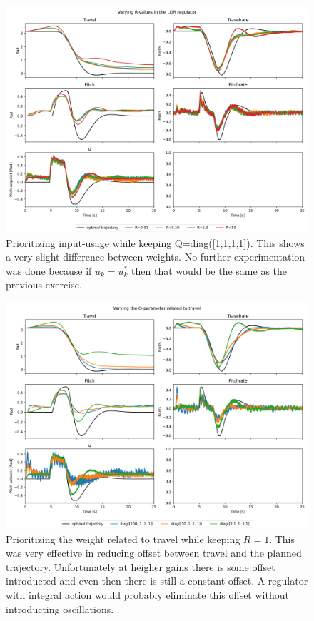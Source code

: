 \documentclass[../main.tex]{subfiles}
\begin{document}
\begin{figure}[h]
	\centering
    \includegraphics[width=0.8\linewidth]{figures/LAB3_R_variations.png}
	\caption{Prioritizing input-usage while keeping Q=diag([1,1,1,1]). This shows a very slight difference between weights. No further experimentation was done because if $u_k = u_k^*$ then that would be the same as the previous exercise.}
	\label{fig:LAB3_R_variations}
\end{figure}

\begin{figure}[h]
	\centering
	\includegraphics[width=0.8\linewidth]{figures/LAB3_Q_variations.png}
	\caption{Prioritizing the weight related to travel while keeping $R=1$. This was very effective in reducing offset between travel and the planned trajectory. Unfortunately at heigher gains there is some offset introducted and even then there is still a constant offset. A regulator with integral action would probably eliminate this offset without introducting oscillations.}
	\label{fig:LAB3_Q_variations_travel}
\end{figure}
\end{document}
